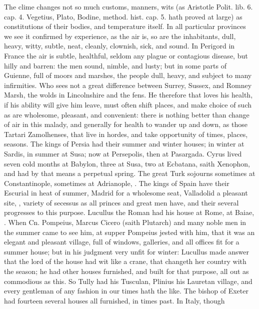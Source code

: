 {The clime changes not so much customs, manners, wits (as Aristotle
Polit. lib. 6. cap. 4. Vegetius, Plato, Bodine, method. hist. cap. 5.
hath proved at large) as constitutions of their bodies, and temperature
itself. In all particular provinces we see it confirmed by experience,
as the air is, so are the inhabitants, dull, heavy, witty, subtle,
neat, cleanly, clownish, sick, and sound. In Perigord in France
the air is subtle, healthful, seldom any plague or contagious disease,
but hilly and barren: the men sound, nimble, and lusty; but in some
parts of Guienne, full of moors and marshes, the people dull, heavy,
and subject to many infirmities. Who sees not a great difference
between Surrey, Sussex, and Romney Marsh, the wolds in Lincolnshire and
the fens. He therefore that loves his health, if his ability will give
him leave, must often shift places, and make choice of such as are
wholesome, pleasant, and convenient: there is nothing better than
change of air in this malady, and generally for health to wander up and
down, as those Tartari Zamolhenses, that live in hordes, and take
opportunity of times, places, seasons. The kings of Persia had their
summer and winter houses; in winter at Sardis, in summer at Susa; now
at Persepolis, then at Pasargada. Cyrus lived seven cold months at
Babylon, three at Susa, two at Ecbatana, saith Xenophon, and had
by that means a perpetual spring. The great Turk sojourns sometimes at
Constantinople, sometimes at Adrianople, \etc{}. The kings of Spain have
their Escurial in heat of summer, Madrid for a wholesome seat,
Valladolid a pleasant site, \etc{}, variety of secessus as all princes and
great men have, and their several progresses to this purpose. Lucullus
the Roman had his house at Rome, at Baiae, \etc{}. When Cn. Pompeius,
Marcus Cicero (saith Plutarch) and many noble men in the summer came to
see him, at supper Pompeius jested with him, that it was an elegant and
pleasant village, full of windows, galleries, and all offices fit for a
summer house; but in his judgment very unfit for winter: Lucullus made
answer that the lord of the house had wit like a crane, that changeth
her country with the season; he had other houses furnished, and built
for that purpose, all out as commodious as this. So Tully had his
Tusculan, Plinius his Lauretan village, and every gentleman of any
fashion in our times hath the like. The bishop of Exeter had
fourteen several houses all furnished, in times past. In Italy, though
}
